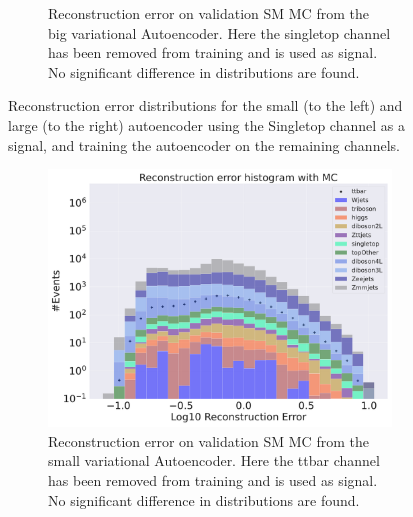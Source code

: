\begin{figure}[h!]
\begin{subfigure}{.45\textwidth}
        \caption{Reconstruction error on validation SM MC from the big variational Autoencoder. Here the singletop channel has been removed from training and 
        is used as signal. No significant difference in distributions are found. }
        \label{fig:vae_big_singletop}
    \end{subfigure}
    \hfill 
    \caption[Reconstruction error using Singletop channel as signal]{Reconstruction error distributions for the small (to the left) and large (to the right) autoencoder using the Singletop channel as a signal, and 
    training the autoencoder on the remaining channels. }
    \label{fig:vae_big_channel_2}
\end{figure}

\begin{figure}[h!]
    \centering
    \begin{subfigure}{.45\textwidth}
        \includegraphics[width=\textwidth]{Figures/VAE_testing/small/b_data_recon_big_rm3_feats_sig_ttbar.pdf}
        \caption{Reconstruction error on validation SM MC from the small variational Autoencoder. Here the ttbar channel has been removed from training and 
        is used as signal. No significant difference in distributions are found. }
        \label{fig:vae_small_ttbar}
    \end{subfigure}
    \hfill 
    \begin{subfigure}{.45\textwidth}

\end{subfigure}
\end{figure}
